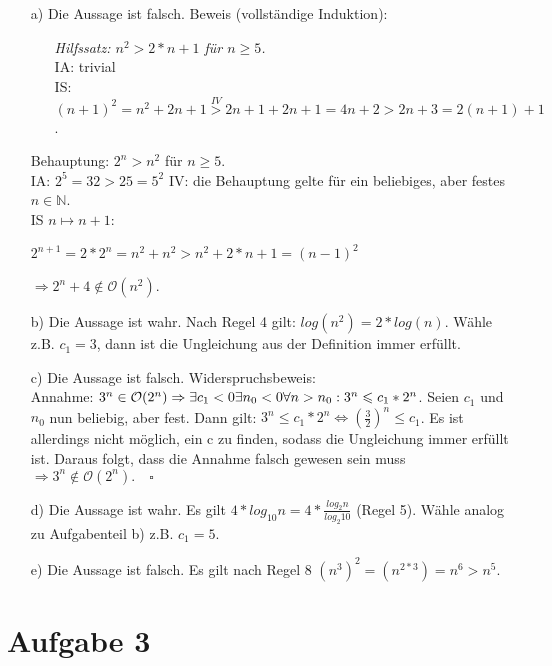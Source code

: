 \documentclass[11pt]{article}
\begin{document}
\begin{itemize}
	\item[a)]
		Die Aussage ist falsch.
		Beweis (vollständige Induktion):
		\begin{itemize}
			\item[]
				\textit{Hilfssatz: $n^2 > 2*n +1$ für $n\geq5$.\\}
				IA: trivial\\
				IS: $(n+1)^2 = n^2 + 2n +1 \overset{IV}{>} 2n+1+2n+1 = 4n+2 > 2n+3=2(n+1)+1$.
		\end{itemize}
		Behauptung: $2^n > n^2$ für $n\geq5$. \\
		IA: $2^5 = 32 > 25 = 5^2$
		IV: die Behauptung gelte für ein beliebiges, aber festes $n \in \mathbb{N} $. \\
		IS $n \mapsto n+1$: \\
		\begin{center}
			$ 2^{n+1} = 2*2^n = n^2 + n^2 > n^2 + 2*n+1=(n-1)^2 $
		\end{center}
		$\Rightarrow 2^n +4 \notin \mathcal{O}(n^2)$. \\
	\item[b)]
		Die Aussage ist wahr. Nach Regel 4 gilt: $log(n^2) = 2*log(n)$. Wähle z.B. $c_1=3$, dann ist die Ungleichung aus der Definition immer erfüllt.\\
	\item[c)]
		Die Aussage ist falsch. Widerspruchsbeweis:\\
		Annahme: $3^n \in \mathcal{O}(2^n) \\ \Rightarrow \exists c_1 <0 \exists n_0 < 0 \forall n > n_0: 3^n \leqslant c_1 *2^n$. Seien $c_1$ und $n_0$ nun beliebig, aber fest. Dann gilt: 
		$3^n \leqslant c_1 * 2^n \Leftrightarrow (\frac{3}{2})^n \leqslant c_1$. Es ist allerdings nicht möglich, ein c zu finden, sodass die Ungleichung immer erfüllt ist. Daraus folgt, dass die Annahme falsch gewesen sein muss $\Rightarrow 3^n \notin \mathcal{O}(2^n). \quad\square$\\
	\item[d)]
		Die Aussage ist wahr. Es gilt $4*log_{10} n = 4* \frac{log_2 n}{log_2 10}$ (Regel 5). Wähle analog zu Aufgabenteil b) z.B. $c_1 = 5$. \\
	\item[e)]
		Die Aussage ist falsch. Es gilt nach Regel 8 $(n^3)^2 = (n^{2*3}) = n^6 > n^5$.
\end{itemize}

\pagebreak

\section*{Aufgabe 3}
\end{document}
